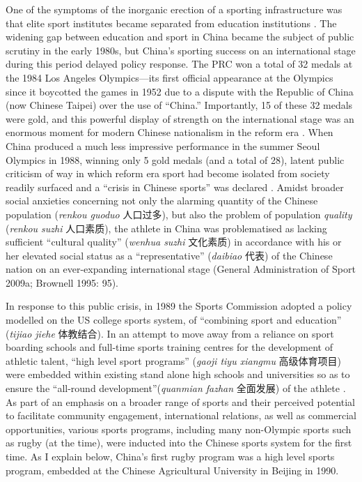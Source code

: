 \begin{CJK}{UTF8}{gbsn}
One of the symptoms of the inorganic erection of a sporting infrastructure was that elite sport institutes became separated from education institutions \citep{Brownell2008}.  The widening gap between education and sport in China became the subject of public scrutiny in the early 1980s, but China's sporting success on an international stage during this period delayed policy response.  The PRC won a total of 32 medals at the 1984 Los Angeles Olympics---its first official appearance at the Olympics since it boycotted the games in 1952 due to a dispute with the Republic of China (now Chinese Taipei) over the use of ``China.''  Importantly, 15 of these 32 medals were gold, and this powerful display of strength on the international stage was an enormous moment for modern Chinese nationalism in the reform era \citep{Brownell2008}.  When China produced a much less impressive performance in the summer Seoul Olympics in 1988, winning only 5 gold medals (and a total of 28), latent public criticism of way in which reform era sport had become isolated from society readily surfaced and a ``crisis in Chinese sports'' was declared \citep[199]{Brownell1995}.  Amidst broader social anxieties concerning not only the alarming quantity of the Chinese population (\textit{renkou guoduo} 人口过多), but also the problem of population \textit{quality} (\textit{renkou suzhi} 人口素质), the athlete in China was problematised as lacking sufficient ``cultural quality'' (\textit{wenhua suzhi} 文化素质) in accordance with his or her elevated social status as a ``representative'' (\textit{daibiao} 代表) of the Chinese nation on an ever-expanding international stage (General Administration of Sport 2009a; Brownell 1995: 95).

In response to this public crisis, in 1989 the Sports Commission adopted a policy modelled on the US college sports system, of ``combining sport and education'' (\textit{tijiao jiehe} 体教结合).  In an attempt to move away from a reliance on sport boarding schools and full-time sports training centres for the development of athletic talent, ``high level sport programs'' (\textit{gaoji tiyu xiangmu} 高级体育项目) were embedded within existing stand alone high schools and universities so as to ensure the ``all-round development''(\textit{quanmian fazhan} 全面发展) of the athlete \citep[203]{Brownell1995}.  As part of an emphasis on a broader range of sports and their perceived potential to facilitate community engagement, international relations, as well as commercial opportunities, various sports programs, including many non-Olympic sports such as rugby (at the time), were inducted into the Chinese sports system for the first time\citep[70]{Knuttgen1990}.  As I explain below, China's first rugby program was a high level sports program, embedded at the Chinese Agricultural University in Beijing in 1990.


\end{CJK}
